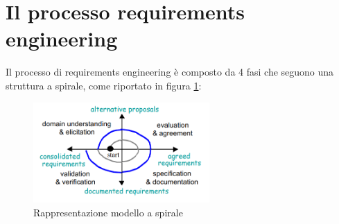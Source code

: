 \section{Il processo requirements engineering}
Il processo di requirements engineering è composto da 4 fasi che seguono una
struttura a spirale, come riportato in figura \ref{fig:spirale}:
\begin{figure}[!ht]
      \centering
      \includegraphics[width=0.6\textwidth]{img/requirements/spirale.png}
      \caption{Rappresentazione modello a spirale}
      \label{fig:spirale}
\end{figure}
